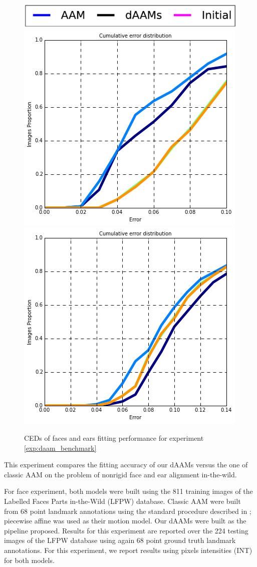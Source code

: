 \begin{figure}[b!]
    \centering
    \includegraphics[width=0.6\columnwidth]{resources/DAAMBenchmark/legend}
    \\
    \includegraphics[width=0.48\columnwidth]{resources/DAAMBenchmark/face}
    \includegraphics[width=0.48\columnwidth]{resources/DAAMBenchmark/ear}
    \caption{CEDs of faces and ears fitting performance for experiment \ref{exp:daam_benchmark}}
    \label{fig:daam_benchmark}
\end{figure}


This experiment compares the fitting accuracy of our dAAMs versus the one of classic AAM on the problem of nonrigid face and ear alignment in-the-wild. 

For face experiment, both models were built using the 811 training images of the Labelled
Faces Parts in-the-Wild (LFPW) \cite{Asthana2014} database. Classic AAM were built from 68 point landmark annotations using the standard procedure described in \cite{Cootes2001,Matthews2004}; piecewise affine was used as their motion model. Our dAAMs were built as the pipeline proposed. Results for this experiment are reported over the 224 testing images of the LFPW database using again 68 point ground truth landmark annotations. For this experiment, we report results using pixels intensities (INT) for both models. 

